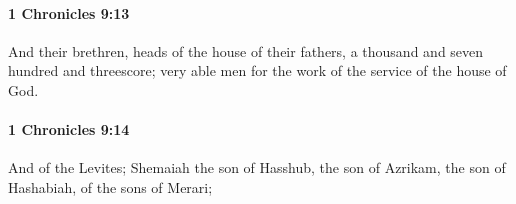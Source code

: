 		\paragraph{1 Chronicles 9:13} %
			\label{1CHRONICLES-9-13}

			And their brethren, heads of the house of their fathers, a thousand and seven hundred and threescore; very able men for the work of the service of the house of God.


		\paragraph{1 Chronicles 9:14} %
			\label{1CHRONICLES-9-14}

			And of the Levites; Shemaiah the son of Hasshub, the son of Azrikam, the son of Hashabiah, of the sons of Merari;


